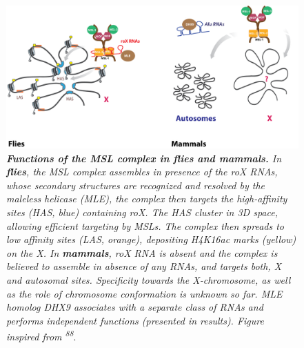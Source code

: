 \documentclass[11pt,twoside]{MPIthesis}
\theoremstyle{definition}
\theoremstyle{definition}
\theoremstyle{definition}
\theoremstyle{remark}
\begin{document}
\clearpage
\begin{figure}

{\centering \includegraphics[width=0.9\linewidth]{figures/intro_fig3} 

}

\caption[Functions of the MSL complex in flies and mammals]{\emph{\textbf{Functions of the MSL complex in flies and
mammals.} In \textbf{flies}, the MSL complex assembles in presence of
the roX RNAs, whose secondary structures are recognized and resolved by
the maleless helicase (MLE), the complex then targets the high-affinity
sites (HAS, blue) containing roX. The HAS cluster in 3D space, allowing
efficient targeting by MSLs. The complex then spreads to low affinity
sites (LAS, orange), depositing H4K16ac marks (yellow) on the X. In
\textbf{mammals}, roX RNA is absent and the complex is believed to
assemble in absence of any RNAs, and targets both, X and autosomal
sites. Specificity towards the X-chromosome, as well as the role of
chromosome conformation is unknown so far. MLE homolog DHX9 associates
with a separate class of RNAs and performs independent functions
(presented in results). Figure inspired from \textsuperscript{88}}.}\label{fig:unnamed-chunk-3}
\end{figure}
\end{document}
